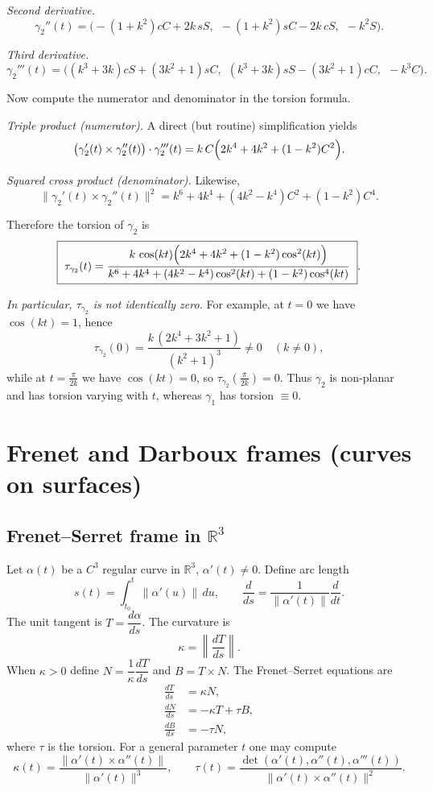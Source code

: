 \documentclass[12pt,a4paper]{article}
\theoremstyle{plain}
\theoremstyle{definition}      %
\begin{document}
\medskip
\noindent\emph{Second derivative.}
\[
\gamma_2''(t)=
\bigl(-(1+k^2)cC+2k\,sS,\ \ -(1+k^2)sC-2k\,cS,\ \ -k^2 S\bigr).
\]

\medskip
\noindent\emph{Third derivative.}
\[
\gamma_2'''(t)=
\bigl((k^3+3k)cS+(3k^2+1)sC,\ \ (k^3+3k)sS-(3k^2+1)cC,\ \ -k^3 C\bigr).
\]

Now compute the numerator and denominator in the torsion formula.

\medskip
\noindent\emph{Triple product (numerator).}
A direct (but routine) simplification yields
\[
\bigl(\gamma_2'(t)\times\gamma_2''(t)\bigr)\cdot\gamma_2'''(t)
=
k\,C\Bigl(2k^4+4k^2+(1-k^2)C^2\Bigr).
\]

\medskip
\noindent\emph{Squared cross product (denominator).}
Likewise,
\[
\|\gamma_2'(t)\times\gamma_2''(t)\|^2
=
k^6+4k^4+(4k^2-k^4)C^2+(1-k^2)C^4.
\]

Therefore the torsion of $\gamma_2$ is
\[
\boxed{
	\ \tau_{\gamma_2}(t)
	=
	\frac{
		k\,\cos(kt)\Bigl(2k^4+4k^2+(1-k^2)\cos^2(kt)\Bigr)
	}{
		k^6+4k^4+(4k^2-k^4)\cos^2(kt)+(1-k^2)\cos^4(kt)
	}
	\ }.
\]

\medskip
\noindent\emph{In particular, $\tau_{\gamma_2}$ is not identically zero.}
For example, at $t=0$ we have $\cos(kt)=1$, hence
\[
\tau_{\gamma_2}(0)
=
\frac{k\,(2k^4+3k^2+1)}{(k^2+1)^3}\neq 0
\quad (k\neq 0),
\]
while at $t=\frac{\pi}{2k}$ we have $\cos(kt)=0$, so $\tau_{\gamma_2}\!\left(\frac{\pi}{2k}\right)=0$.
Thus $\gamma_2$ is non-planar and has torsion varying with $t$, whereas $\gamma_1$ has torsion $\equiv 0$.



	
	\section*{Frenet and Darboux frames (curves on surfaces)}
	
	\subsection*{Frenet--Serret frame in $\mathbb{R}^3$}
	Let $\alpha(t)$ be a $C^3$ regular curve in $\mathbb{R}^3$, $\alpha'(t)\neq 0$.
	Define arc length
	\[
	s(t)=\int_{t_0}^t \|\alpha'(u)\|\,du,
	\qquad
	\frac{d}{ds}=\frac{1}{\|\alpha'(t)\|}\frac{d}{dt}.
	\]
	The unit tangent is $T=\dfrac{d\alpha}{ds}$. The curvature is
	\[
	\kappa=\left\|\frac{dT}{ds}\right\|.
	\]
	When $\kappa>0$ define $N=\dfrac{1}{\kappa}\dfrac{dT}{ds}$ and $B=T\times N$.
	The Frenet--Serret equations are
	\[
	\begin{aligned}
		\frac{dT}{ds}&=\kappa N,\\
		\frac{dN}{ds}&=-\kappa T+\tau B,\\
		\frac{dB}{ds}&=-\tau N,
	\end{aligned}
	\]
	where $\tau$ is the torsion.
	For a general parameter $t$ one may compute
	\[
	\kappa(t)=\frac{\|\alpha'(t)\times \alpha''(t)\|}{\|\alpha'(t)\|^3},
	\qquad
	\tau(t)=\frac{\det(\alpha'(t),\alpha''(t),\alpha'''(t))}
	{\|\alpha'(t)\times \alpha''(t)\|^2}.
	\]
	
\end{document}
